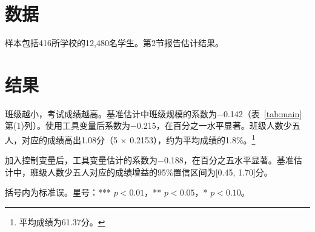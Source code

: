 \documentclass{ctexart}
\begin{document}
\section{数据}

样本包括416所学校的12,480名学生。第2节报告估计结果。

\section{结果}

班级越小，考试成绩越高。基准估计中班级规模的系数为$-$0.142（表~\ref{tab:main}第(1)列）。使用工具变量后系数为$-$0.215，在百分之一水平显著。班级人数少五人，对应的成绩高出1.08分（5 $\times$ 0.2153），约为平均成绩的1.8\%。\footnote{平均成绩为61.37分。}

加入控制变量后，工具变量估计的系数为$-$0.188，在百分之五水平显著。基准估计中，班级人数少五人对应的成绩增益的95\%置信区间为[0.45, 1.70]分。

\begin{table}[h]
\centering
\caption{班级规模与考试成绩}\label{tab:main}

\par\footnotesize 括号内为标准误。星号：*** $p<0.01$，** $p<0.05$，* $p<0.10$。
\end{table}
\end{document}
